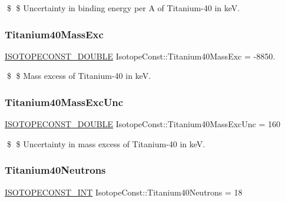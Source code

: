 \$ \$ Uncertainty in binding energy per A of Titanium-\/40 in keV. \mbox{\label{group___isotope_const-_titanium-_ti40_ga65e93841720be76490a8c3fd2959cc9b}} 
\subsubsection{\texorpdfstring{Titanium40\+Mass\+Exc}{Titanium40MassExc}}
{\footnotesize\ttfamily \mbox{\hyperlink{group___isotope_const-_macros_ga8f45a7272ce02c0b4c65c44636ed719a}{I\+S\+O\+T\+O\+P\+E\+C\+O\+N\+S\+T\+\_\+\+D\+O\+U\+B\+LE}} Isotope\+Const\+::\+Titanium40\+Mass\+Exc = -\/8850.}

\$ \$ Mass excess of Titanium-\/40 in keV. \mbox{\label{group___isotope_const-_titanium-_ti40_ga9e7362dbdecb8f8f89e7ba12b8297bb7}} 
\subsubsection{\texorpdfstring{Titanium40\+Mass\+Exc\+Unc}{Titanium40MassExcUnc}}
{\footnotesize\ttfamily \mbox{\hyperlink{group___isotope_const-_macros_ga8f45a7272ce02c0b4c65c44636ed719a}{I\+S\+O\+T\+O\+P\+E\+C\+O\+N\+S\+T\+\_\+\+D\+O\+U\+B\+LE}} Isotope\+Const\+::\+Titanium40\+Mass\+Exc\+Unc = 160}

\$ \$ Uncertainty in mass excess of Titanium-\/40 in keV. \mbox{\label{group___isotope_const-_titanium-_ti40_ga507659d7674dfd487f1ed69e87843aa5}} 
\subsubsection{\texorpdfstring{Titanium40\+Neutrons}{Titanium40Neutrons}}
{\footnotesize\ttfamily \mbox{\hyperlink{group___isotope_const-_macros_ga5f18360b3e99483a35c32d789e62621c}{I\+S\+O\+T\+O\+P\+E\+C\+O\+N\+S\+T\+\_\+\+I\+NT}} Isotope\+Const\+::\+Titanium40\+Neutrons = 18}

